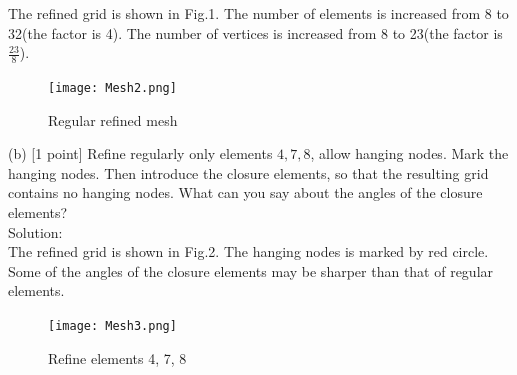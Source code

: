 \documentclass[a4paper]{article}
\begin{document}
\noindent The refined grid is shown in Fig.1. The number of elements is increased  from 8 to 32(the factor is 4). The number of vertices is increased from 8 to 23(the factor is $\frac{23}{8}$).\\

\begin{figure}[htbp]
	\centering
	\begin{minipage}[t]{0.7\textwidth}
		\centering		\texttt{[image: Mesh2.png]}
		\caption{Regular refined mesh}
	\end{minipage}
\end{figure}

\noindent (b) [1 point] Refine regularly only elements $4,7,8$, allow hanging nodes. Mark the hanging nodes. Then introduce the closure elements, so that the resulting grid contains no hanging nodes. What can you say about the angles of the closure elements?\\

\noindent Solution:\\

\noindent The refined grid is shown in Fig.2. The hanging nodes is marked by red circle. Some of the angles of the closure elements may be sharper than that of regular elements.\\

\begin{figure}[htbp]
	\centering
	\begin{minipage}[t]{0.7\textwidth}
		\centering		\texttt{[image: Mesh3.png]}
		\caption{Refine elements 4, 7, 8}
	\end{minipage}
\end{figure}
\end{document}
